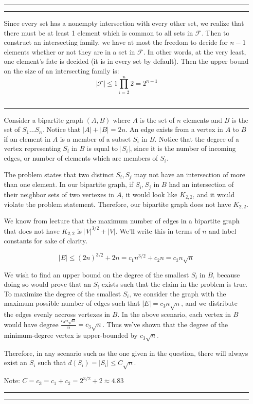 \documentclass[11pt,letterpaper]{article}
\newcommand{\question}[1] {\vspace{.25in} \hrule\vspace{0.5em}
\noindent{\bf #1} \vspace{0.5em}
\hrule \vspace{.10in}}
\begin{document}
\question{4}
Since every set has a nonempty intersection with every other set, we realize that there must be at least 1 element which is common to all sets in $\mathcal{F}$.
Then to construct an intersecting family, we have at most the freedom to decide for $n-1$ elements whether or not they are in a set in $\mathcal{F}$. In other words, at the very least, one element's fate is decided (it is in every set by default).
Then the upper bound on the size of an intersecting family is:
$$ |\mathcal{F}| \leq 1 \prod_{i=2}^{n} 2 = 2^{n-1}$$

\question{5}

Consider a bipartite graph $(A,B)$ where $A$ is the set of $n$ elements and $B$ is the set of $S_1...S_n$. Notice that $|A| + |B| = 2n$.
An edge exists from a vertex in $A$ to $B$ if an element in $A$ is a member of a subset $S_i$ in $B$. Notice that the degree of a vertex representing $S_i$ in $B$ is equal to $|S_i|$, since it is the number of incoming edges, or number of elements which are members of $S_i$.

The problem states that two distinct $S_i, S_j$ may not have an intersection of more than one element.
In our bipartite graph, if $S_i, S_j$ in $B$ had an intersection of their neighbor sets of two vertexes in $A$, it would look like $K_{2,2}$,
and it would violate the problem statement. Therefore, our bipartite graph does not have $K_{2,2}$.

We know from lecture that the maximum number of edges in a bipartite graph that does not have $K_{2,2}$ is $|V|^{3/2} + |V|$. We'll write this in terms of $n$ and label constants for sake of clarity.

$$ |E| \leq (2n)^{3/2} + 2n = c_1 n^{3/2} + c_2n = c_{3}n\sqrt{n} $$

We wish to find an upper bound on the degree of the smallest $S_i$ in $B$, because doing so would prove that an $S_i$ exists such that the claim in the problem is true.
To maximize the degree of the smallest $S_i$, we consider the graph with the maximum possible number of edges such that $|E| = c_{3}n\sqrt{n}$, and we distribute the edges evenly accross vertexes in $B$.
In the above scenario, each vertex in $B$ would have degree $\frac{c_{3}n\sqrt{n}}{n} = c_{3}\sqrt{n}$. Thus we've shown that the degree of the minimum-degree vertex is upper-bounded by $c_{3}\sqrt{n}$.

Therefore, in any scenario such as the one given in the question, there will always exist an $S_i$ such that $d(S_i) = |S_i| \leq C \sqrt{n}$.

Note: $C = c_3 = c_1 + c_2 = 2^{3/2} + 2 \approx 4.83$

\question{6}
\end{document}
